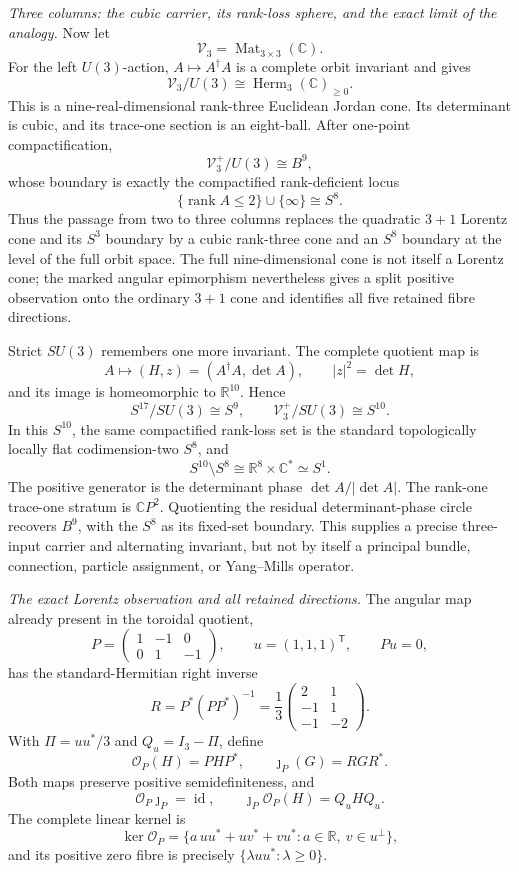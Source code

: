 \documentclass[10pt,letterpaper]{article}
\begin{document}
\medskip\noindent
\textit{Three columns: the cubic carrier, its rank-loss sphere, and the
exact limit of the analogy.}
Now let
\[
 \mathscr V_3=\operatorname{Mat}_{3\times3}(\mathbb C).
\]
For the left \(U(3)\)-action, \(A\mapsto A^\dagger A\) is a complete orbit
invariant and gives
\[
 \mathscr V_3/U(3)
 \cong\operatorname{Herm}_3(\mathbb C)_{\geq0}.
\]
This is a nine-real-dimensional rank-three Euclidean Jordan cone.  Its
determinant is cubic, and its trace-one section is an eight-ball.  After
one-point compactification,
\[
 \mathscr V_3^+/U(3)\cong B^9,
\]
whose boundary is exactly the compactified rank-deficient locus
\[
 \{\operatorname{rank}A\le2\}\cup\{\infty\}\cong S^8.
\]
Thus the passage from two to three columns replaces the quadratic
\(3+1\) Lorentz cone and its \(S^3\) boundary by a cubic rank-three cone and
an \(S^8\) boundary at the level of the full orbit space.  The full
nine-dimensional cone is not itself a Lorentz cone; the marked angular
epimorphism nevertheless gives a split positive observation onto the
ordinary \(3+1\) cone and identifies all five retained fibre directions.

Strict \(SU(3)\) remembers one more invariant.  The complete quotient map is
\[
 A\longmapsto(H,z)=(A^\dagger A,\det A),
 \qquad |z|^2=\det H,
\]
and its image is homeomorphic to \(\mathbb R^{10}\).  Hence
\[
 S^{17}/SU(3)\cong S^9,
 \qquad
 \mathscr V_3^+/SU(3)\cong S^{10}.
\]
In this \(S^{10}\), the same compactified rank-loss set is the standard
topologically locally flat codimension-two \(S^8\), and
\[
 S^{10}\setminus S^8
 \cong\mathbb R^8\times\mathbb C^*\simeq S^1.
\]
The positive generator is the determinant phase
\(\det A/|\det A|\).  The rank-one trace-one stratum is
\(\mathbb CP^2\).  Quotienting the residual determinant-phase circle recovers
\(B^9\), with the \(S^8\) as its fixed-set boundary.  This supplies a precise
three-input carrier and alternating invariant, but not by itself a principal
bundle, connection, particle assignment, or Yang--Mills operator.

\medskip\noindent
\textit{The exact Lorentz observation and all retained directions.}
The angular map already present in the toroidal quotient,
\[
 P=\begin{pmatrix}1&-1&0\\0&1&-1\end{pmatrix},\qquad
 u=(1,1,1)^{\mathsf T},\qquad Pu=0,
\]
has the standard-Hermitian right inverse
\[
 R=P^*(PP^*)^{-1}
 =\frac13\begin{pmatrix}2&1\\-1&1\\-1&-2\end{pmatrix}.
\]
With \(\Pi=uu^*/3\) and \(Q_u=I_3-\Pi\), define
\[
 \mathcal O_P(H)=PHP^*,\qquad \jmath_P(G)=RGR^*.
\]
Both maps preserve positive semidefiniteness, and
\[
 \boxed{\mathcal O_P\jmath_P=\operatorname{id},\qquad
 \jmath_P\mathcal O_P(H)=Q_uHQ_u.}
\]
The complete linear kernel is
\[
 \ker\mathcal O_P
 =\{a\,uu^*+uv^*+vu^*:a\in\mathbb R,\ v\in u^\perp\},
\]
and its positive zero fibre is precisely
\(\{\lambda uu^*: \lambda\geq0\}\).
\end{document}
